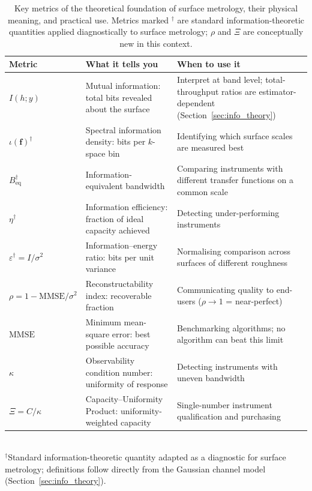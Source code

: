 \documentclass[review,12pt]{elsarticle}
\begin{document}
\begin{table}[htbp]
    \centering
    \caption{Key metrics of the theoretical foundation of surface metrology, their physical meaning, and practical use. Metrics marked $^\dagger$ are standard information-theoretic quantities applied diagnostically to surface metrology; $\rho$ and $\Xi$ are conceptually new in this context.\label{tab:practitioner}}
    \footnotesize
    \setlength{\tabcolsep}{4pt}
    \renewcommand{\arraystretch}{0.95}
    \begin{tabular}{p{2.0cm}p{5.0cm}p{5.0cm}}
        \toprule
        \textbf{Metric} & \textbf{What it tells you} & \textbf{When to use it} \\
        \midrule
        $ I(h;y)$ & Mutual information: total bits revealed about the surface & Interpret at band level; total-throughput ratios are estimator-dependent (Section~\ref{sec:info_theory}) \\[2pt]
        $\iota(\mathbf{f})^\dagger$ & Spectral information density: bits per $ k$-space bin & Identifying which surface scales are measured best \\[2pt]
        $B_\mathrm{eq}^\dagger$ & Information-equivalent bandwidth & Comparing instruments with different transfer functions on a common scale \\[2pt]
        $\eta^\dagger$ & Information efficiency: fraction of ideal capacity achieved & Detecting under-performing instruments \\[2pt]
        $\varepsilon^\dagger = I/\sigma^2$ & Information--energy ratio: bits per unit variance & Normalising comparison across surfaces of different roughness \\[2pt]
        $\rho = 1 - \mathrm{MMSE}/\sigma^2$ & Reconstructability index: recoverable fraction & Communicating quality to end-users ($\rho \to 1$ = near-perfect) \\[2pt]
        $\mathrm{MMSE}$ & Minimum mean-square error: best possible accuracy & Benchmarking algorithms; no algorithm can beat this limit \\[2pt]
        $\kappa$ & Observability condition number: uniformity of response & Detecting instruments with uneven bandwidth \\[2pt]
        $\Xi = C/\kappa$ & Capacity--Uniformity Product: uniformity-weighted capacity & Single-number instrument qualification and purchasing \\[2pt]
        \bottomrule
    \end{tabular}
    \\[4pt]
    {\footnotesize $^\dagger$Standard information-theoretic quantity adapted as a diagnostic for surface metrology; definitions follow directly from the Gaussian channel model (Section~\ref{sec:info_theory}).}
\end{table}
\end{document}
